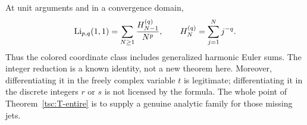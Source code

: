 At unit arguments and in a convergence domain,
\[
 \operatorname{Li}_{p,q}(1,1)=\sum_{N\ge1}\frac{H_{N-1}^{(q)}}{N^p},
 \qquad H_N^{(q)}=\sum_{j=1}^N j^{-q}.
\]
Thus the colored coordinate class includes generalized harmonic Euler sums.
The integer reduction is a known identity, not a new theorem here.
Moreover, differentiating it in the freely complex variable $t$ is
legitimate; differentiating it in the discrete integers $r$ or $s$ is not
licensed by the formula. The whole point of Theorem~\ref{tsc:T-entire}
is to supply a genuine analytic family for those missing jets.
